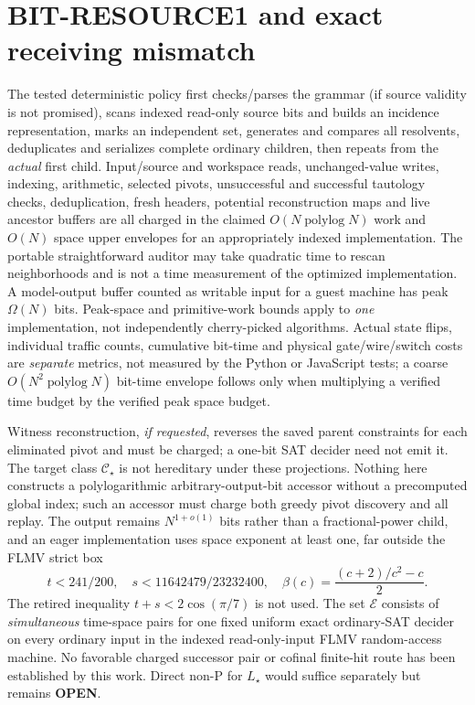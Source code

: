 \documentclass[11pt]{article}
\newcommand{\CS}{\mathcal C_\star}
\begin{document}
\section{BIT-RESOURCE1 and exact receiving mismatch}
The tested deterministic policy first checks/parses the grammar
(if source validity is not promised), scans indexed read-only
source bits and builds an incidence representation, marks an
independent set, generates and compares all resolvents,
deduplicates and serializes complete ordinary children, then
repeats from the \emph{actual} first child. Input/source and
workspace reads, unchanged-value writes, indexing, arithmetic,
selected pivots, unsuccessful and successful tautology checks,
deduplication, fresh headers, potential reconstruction maps and
live ancestor buffers are all charged in the claimed
\(O(N\operatorname{polylog}N)\) work and \(O(N)\) space upper
envelopes for an appropriately indexed implementation.
The portable straightforward auditor may take quadratic time
to rescan neighborhoods and is not a time measurement of the
optimized implementation. A model-output buffer counted as
writable input for a guest machine has peak \(\Omega(N)\) bits.
Peak-space and primitive-work bounds apply to \emph{one}
implementation, not independently cherry-picked algorithms.
Actual state flips, individual traffic counts, cumulative
bit-time and physical gate/wire/switch costs are \emph{separate}
metrics, not measured by the Python or JavaScript tests;
a coarse \(O(N^2\operatorname{polylog}N)\) bit-time envelope follows only
when multiplying a verified time budget by the verified peak
space budget.

Witness reconstruction, \emph{if requested}, reverses the
saved parent constraints for each eliminated pivot and must be
charged; a one-bit SAT decider need not emit it. The target
class \(\CS\) is not hereditary under these projections.
Nothing here constructs a polylogarithmic arbitrary-output-bit
accessor without a precomputed global index; such an accessor
must charge both greedy pivot discovery and all replay.
The output remains \(N^{1+o(1)}\) bits rather than a
fractional-power child, and an eager implementation uses
space exponent at least one, far outside the FLMV strict box
\[
t<241/200,\quad
s<11642479/23232400,\quad
\beta(c)=\frac{(c+2)/c^2-c}{2}.
\]
The retired inequality \(t+s<2\cos(\pi/7)\) is not used.
The set \(\mathcal E\) consists of \emph{simultaneous} time-space
pairs for one fixed uniform exact ordinary-SAT decider on
every ordinary input in the indexed read-only-input FLMV
random-access machine. No favorable charged successor pair or
cofinal finite-hit route has been established by this work.
Direct non-P for \(L_\star\) would suffice separately but
remains \textbf{OPEN}.
\end{document}
